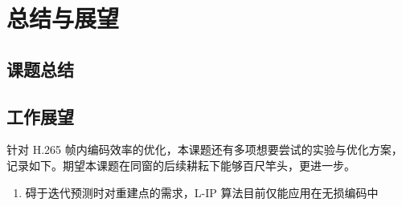 \chapter{总结与展望}
\label{cha:c5}

\section{课题总结}

\section{工作展望}
针对 H.265 帧内编码效率的优化，本课题还有多项想要尝试的实验与优化方案，记录如下。期望本课题在同窗的后续耕耘下能够百尺竿头，更进一步。
\begin{enumerate}
    \item 碍于迭代预测时对重建点的需求，L-IP 算法目前仅能应用在无损编码中
    
\end{enumerate}